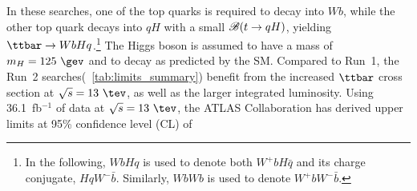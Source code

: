In these searches, one of the top quarks is required to decay into $Wb$, while the other top quark decays into $qH$ with a small $\mathscr{B}(t\to qH)$, yielding $\ttbar \to WbHq$.\footnote{In the following, $WbHq$ is used to denote both $W^+b H\bar{q}$ and its charge conjugate, $HqW^- \bar{b}$. Similarly, 
$WbWb$ is used to denote $W^+b W^- \bar{b}$.}  The Higgs boson is assumed to have a mass of $m_H=125~\gev$ and to decay as predicted by
the SM.
Compared to Run~1, the Run~2 searches(~\ref{tab:limits_summary}) benefit from the increased $\ttbar$ cross section at $\sqrt{s}=13~\tev$, as well as the larger integrated luminosity.
Using 36.1~fb$^{-1}$ of data at $\sqrt{s}=13~\tev$, the ATLAS Collaboration has derived upper limits at 95\% confidence level (CL) of
